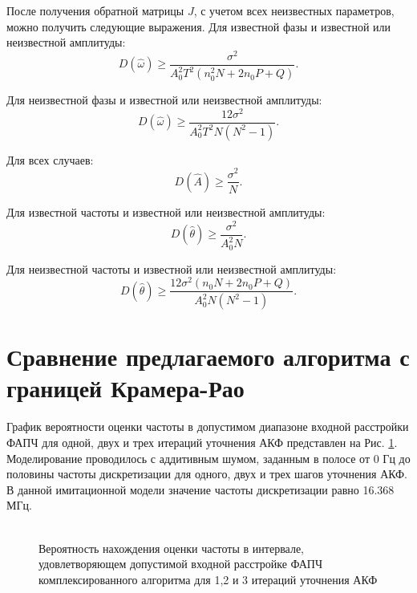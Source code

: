 После получения обратной матрицы ${J}$, с учетом всех неизвестных параметров, можно получить следующие выражения.
Для известной фазы и известной или неизвестной амплитуды:
\begin{equation}
	\label{eq:clrb_est_omega_1}
	D(\hat{\omega}) \ge \frac{\sigma^2}{A_0^2 T^2 (n_0^2 N + 2n_0P + Q)}.
\end{equation}

Для неизвестной фазы и известной или неизвестной амплитуды:
\begin{equation}
	\label{eq:clrb_est_omega_2}
	D(\hat{\omega}) \ge \frac{12\sigma^2}{A_0^2 T^2N(N^2-1)}.
\end{equation}

Для всех случаев:
\begin{equation}
	\label{eq:clrb_est_b_1}
	D(\hat{A}) \ge \frac{\sigma^2}{N}.
\end{equation}

Для известной частоты и известной или неизвестной амплитуды:
\begin{equation}
	\label{eq:clrb_est_b_1}
	D(\hat{\theta}) \ge \frac{\sigma^2}{A_0^2N}.
\end{equation}

Для неизвестной частоты и известной или неизвестной амплитуды:
\begin{equation}
	\label{eq:clrb_est_b_1}
	D(\hat{\theta}) \ge \frac{12\sigma^2(n_0N + 2n_0P + Q)}{A_0^2N(N^2-1)}.
\end{equation}

\section{Сравнение предлагаемого алгоритма с границей Крамера-Рао}
График вероятности оценки частоты в допустимом диапазоне входной расстройки ФАПЧ для одной, двух и трех итераций уточнения АКФ представлен на Рис. \ref{pic:ar_dma_probability}.
Моделирование проводилось с аддитивным шумом, заданным в полосе от 0 Гц до половины частоты дискретизации для одного, двух и трех шагов уточнения АКФ.
В данной имитационной модели значение частоты дискретизации равно 16.368 МГц.
\begin{figure}[h]
\center{}
	\caption{\\Вероятность нахождения оценки частоты в интервале, удовлетворяющем допустимой входной расстройке ФАПЧ комплексированного алгоритма для 1,2 и 3 итераций уточнения АКФ}
	\label{pic:ar_dma_probability}
\end{figure}

